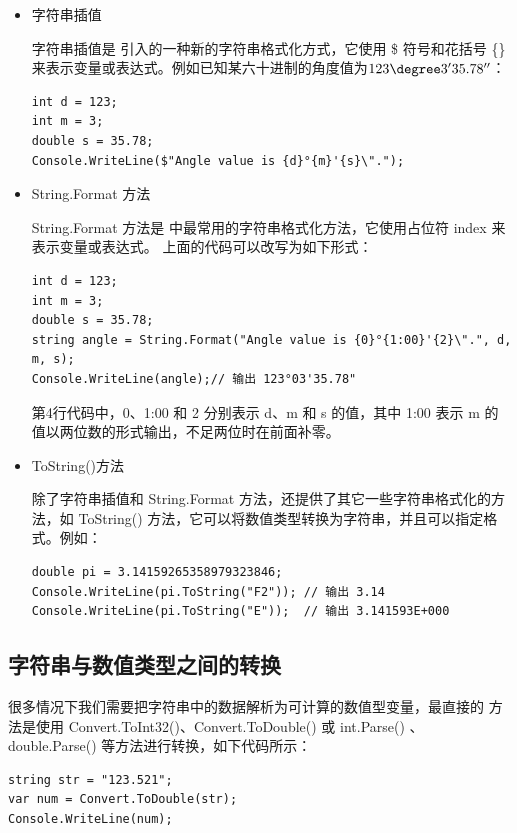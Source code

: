 \begin{itemize}
    \item 字符串插值

          字符串插值是  引入的一种新的字符串格式化方式，它使用 \$ 符号和花括号 \{\} 来表示变量或表达式。例如已知某六十进制的角度值为$123\degree3'35.78''$：

          \begin{lstlisting}
int d = 123;
int m = 3;
double s = 35.78;
Console.WriteLine($"Angle value is {d}°{m}'{s}\".");
\end{lstlisting}

    \item String.Format 方法

          String.Format 方法是 \cs 中最常用的字符串格式化方法，它使用占位符 {index} 来表示变量或表达式。
          上面的代码可以改写为如下形式：

          \begin{lstlisting}
int d = 123;
int m = 3;
double s = 35.78;
string angle = String.Format("Angle value is {0}°{1:00}'{2}\".", d, m, s);
Console.WriteLine(angle);// 输出 123°03'35.78"
\end{lstlisting}

          第4行代码中，{0}、{1:00} 和 {2} 分别表示 d、m 和 s 的值，其中 {1:00} 表示 m 的值以两位数的形式输出，不足两位时在前面补零。

    \item ToString()方法

          除了字符串插值和 String.Format 方法，\cs 还提供了其它一些字符串格式化的方法，如 ToString() 方法，它可以将数值类型转换为字符串，并且可以指定格式。例如：

          \begin{lstlisting}
double pi = 3.14159265358979323846;
Console.WriteLine(pi.ToString("F2")); // 输出 3.14
Console.WriteLine(pi.ToString("E"));  // 输出 3.141593E+000
\end{lstlisting}

\end{itemize}

\subsection{字符串与数值类型之间的转换}
很多情况下我们需要把字符串中的数据解析为可计算的数值型变量，最直接的
方法是使用 Convert.ToInt32()、Convert.ToDouble() 或 int.Parse() 、double.Parse() 等方法进行转换，如下代码所示：

\begin{lstlisting}
string str = "123.521";
var num = Convert.ToDouble(str);
Console.WriteLine(num);
\end{lstlisting}

